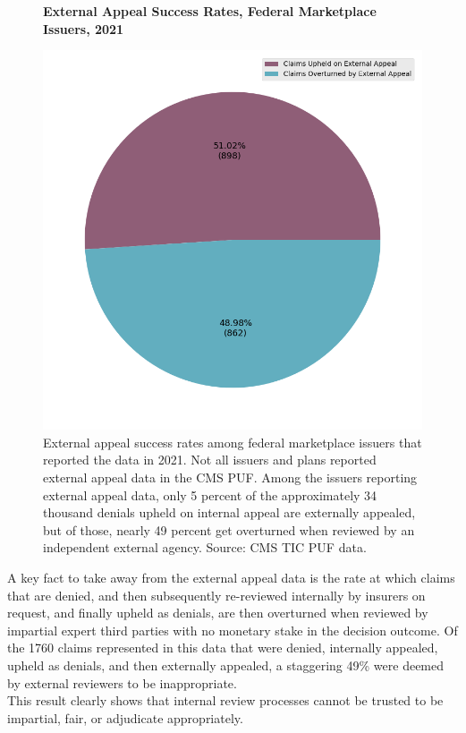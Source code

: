 \documentclass[psamsfonts]{amsart}
\theoremstyle{plain}
\theoremstyle{definition}
\theoremstyle{remark}
\begin{document}
\begin{figure}
	\centering
	\textbf{External Appeal Success Rates, Federal Marketplace Issuers, 2021}\par\medskip
	\includegraphics[width=0.85\columnwidth]{images/cms_puf/external_appeal_success_rates.png}
	\caption{External appeal success rates among federal marketplace issuers that reported the data in 2021. Not all issuers and plans reported external appeal data in the CMS PUF. Among the issuers reporting external appeal data, only 5 percent of the approximately 34 thousand denials upheld on internal appeal are externally appealed, but of those, nearly 49 percent get overturned when reviewed by an independent external agency. Source: CMS TIC PUF data.}
	\label{federal_external_appeal_success_rates}
\end{figure}

A key fact to take away from the external appeal data is the rate at which claims that are denied, and then subsequently re-reviewed internally by insurers on request, and finally upheld as denials, are then overturned when reviewed by impartial expert third parties with no monetary stake in the decision outcome. Of the 1760 claims represented in this data that were denied, internally appealed, upheld as denials, and then externally appealed, a staggering 49\% were deemed by external reviewers to be inappropriate.\\

This result clearly shows that internal review processes cannot be trusted to be impartial, fair, or adjudicate appropriately.\\
\end{document}
